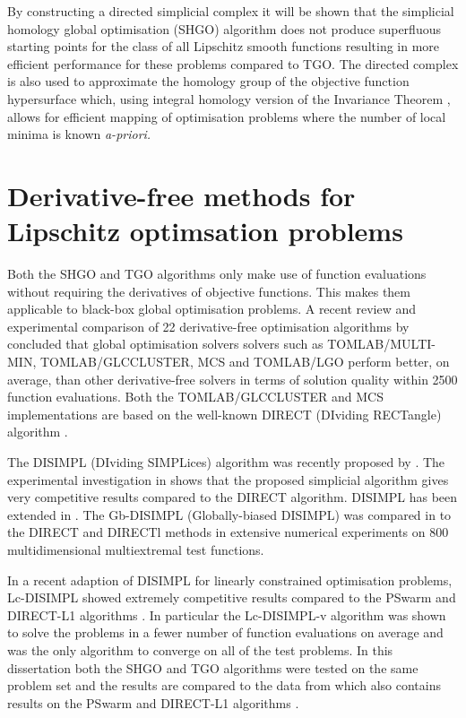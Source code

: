 By constructing a directed simplicial complex it will be shown that the simplicial homology global optimisation (SHGO) algorithm does not produce superfluous starting points for the class of all Lipschitz smooth functions resulting in more efficient performance for these problems compared to TGO. The directed complex is also used to approximate the homology group of the objective function hypersurface which, using integral homology version of the Invariance Theorem \citep{Henle1979}, allows for efficient mapping of optimisation problems where the number of local minima is known \it{a-priori}\normalfont. %

\section{Derivative-free methods for Lipschitz optimsation problems}
Both the SHGO and TGO algorithms only make use of function evaluations without requiring the derivatives of objective functions. This makes them applicable to black-box global optimisation problems. A recent review and experimental comparison of 22 derivative-free optimisation algorithms by \citet{Rios2013} concluded that global optimisation solvers solvers such as TOMLAB/MULTI-MIN, TOMLAB/GLCCLUSTER, MCS and TOMLAB/LGO perform better, on average, than other derivative-free solvers in terms of solution quality within 2500 function evaluations. Both the TOMLAB/GLCCLUSTER and MCS \citep{Huyer1999} implementations are based on the well-known DIRECT (DIviding RECTangle) algorithm \citep{Jones1993}.
 
The DISIMPL (DIviding SIMPLices) algorithm was recently proposed by \citet{Paul2014b}. The experimental investigation in \citet{Paul2014b} shows that the proposed simplicial algorithm gives very competitive results compared to the DIRECT algorithm. DISIMPL has been extended in \citet{paulavivcius2014simplicial, Paul2014a}. The Gb-DISIMPL (Globally-biased DISIMPL) was compared in \citet{Paul2014a} to the DIRECT and DIRECTl methods in extensive numerical experiments on 800 multidimensional multiextremal test functions.

In a recent adaption of DISIMPL for linearly constrained optimisation problems, Lc-DISIMPL \citep{Paul2016} showed extremely competitive results compared to the PSwarm \citep{Vaz2008} and DIRECT-L1 algorithms \citep{finkel2003direct}. In particular the Lc-DISIMPL-v algorithm was shown to solve the problems in a fewer number of function evaluations on average and was the only algorithm to converge on all of the test problems. In this dissertation both the SHGO and TGO algorithms were tested on the same problem set and the results are compared to the data from \citet{Paul2016} which also contains results on the PSwarm \citep{Vaz2008} and DIRECT-L1 algorithms \citep{finkel2003direct}.

